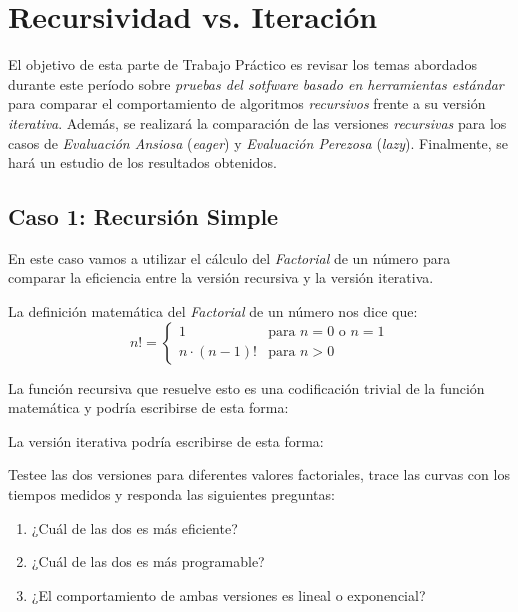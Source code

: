 \section*{Recursividad vs. Iteración}

El objetivo de esta parte de Trabajo Práctico es revisar los temas
abordados durante este período sobre \emph{pruebas del sotfware
basado en herramientas estándar} para comparar el comportamiento
de algoritmos \emph{recursivos} frente a su versión \emph{iterativa}.
Además, se realizará la comparación de las versiones \emph{recursivas}
para los casos de \emph{Evaluación Ansiosa} (\emph{eager}) y
\emph{Evaluación Perezosa} (\emph{lazy}). Finalmente, se hará un estudio de los resultados obtenidos.


\subsection*{Caso 1: Recursión Simple}

En este caso vamos a utilizar el cálculo del \emph{Factorial} de un número para comparar la eficiencia entre la versión recursiva y la versión iterativa.

La definición matemática del \emph{Factorial} de un número nos dice que:
\begin{equation*}
    n! = \left\{ \begin{array}{ll}
        1                & \text{para } n = 0 \text{ o } n = 1 \\
        n \cdot (n - 1)! & \text{para } n > 0
    \end{array} \right.
\end{equation*}

La función recursiva que resuelve esto es una codificación trivial de la función matemática y podría escribirse de esta forma:



La versión iterativa podría escribirse de esta forma:



Testee las dos versiones para diferentes valores factoriales, trace las curvas con los
tiempos medidos y responda las siguientes preguntas:
\begin{enumerate}
    \item ¿Cuál de las dos es más eficiente?
    \item ¿Cuál de las dos es más programable?
    \item ¿El comportamiento de ambas versiones es lineal o exponencial?
\end{enumerate}


